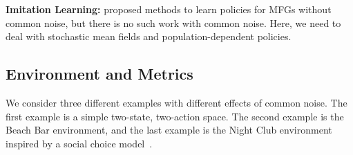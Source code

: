 \documentclass{article}
\theoremstyle{plain}
\begin{document}


\noindent\textbf{Imitation Learning:} \citep{Chen2022IndividualIRLMFG,Anahtarci2025MaxCausalEntropyMFG,Zhao2025MeanFieldCorrelatedIL} proposed methods to learn policies for MFGs without common noise, but there is no such work with common noise. Here, we need to deal with stochastic mean fields and population-dependent policies. %

\subsection{Environment and Metrics}
We consider three different examples with different effects of common noise. The first example is a simple two-state, two-action space. The second example is the Beach Bar environment, and the last example is the Night Club environment inspired by a social choice model~\citep{salhab2019collective}. 
\end{document}
